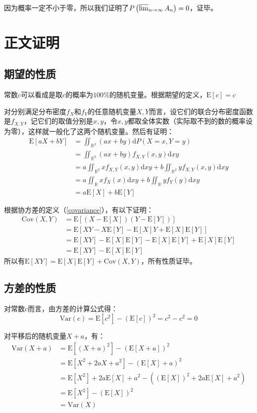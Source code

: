\documentclass[UTF8]{ctexbook}
\begin{document}
因为概率一定不小于零，所以我们证明了$P\left(\varlimsup_{n\to\infty}A_n\right)=0$，证毕。
\section{正文证明}
\subsection{期望的性质}
\label{mean-proof}
常数$c$可以看成是取$c$的概率为$100\%$的随机变量。根据期望的定义，$\mathrm E[c]=c$

对分别满足分布密度$f_X$和$f_Y$的任意随机变量$X, Y$而言，设它们的联合分布密度函数是$f_{X,Y}$，记它们的取值分别是$x, y$，令$x, y$都取全体实数（实际取不到的数的概率设为零），这样就一般化了这两个随机变量。然后有证明：
\begin{align*}
	\mathrm E[aX+bY]&=\iint_{\mathbb{R}^2}(ax+by)\mathrm dP(X=x, Y=y) \\
	&=\iint_{\mathbb{R}^2}(ax+by)f_{X,Y}(x,y)\mathrm dxy \\
	&=a\iint_{\mathbb{R}^2}xf_{X,Y}(x,y)\mathrm dxy+b\iint_{\mathbb{R}^2}yf_{X,Y}(x,y)\mathrm dxy \\
	&=a\iint_{\mathbb{R}}xf_{X}(x)\mathrm dxy+b\iint_{\mathbb{R}}yf_{Y}(y)\mathrm dxy \\
	&=a\mathrm E[X]+b\mathrm E[Y]
\end{align*}

根据协方差的定义（\ref{covariance}），有以下证明：
\begin{align*}
	\mathrm{Cov}(X,Y)&=\mathrm E[(X-\mathrm E[X])(Y-\mathrm E[Y])] \\
	&=\mathrm E[XY-X\mathrm E[Y]-\mathrm E[X]Y+\mathrm E[X]\mathrm E[Y]] \\
	&=\mathrm E[XY]-\mathrm E[X]\mathrm E[Y]-\mathrm E[X]\mathrm E[Y]+\mathrm E[X]\mathrm E[Y]\\
	&=\mathrm E[XY]-\mathrm E[X]\mathrm E[Y]
\end{align*}
所以有$\mathrm E[XY]=\mathrm E[X]\mathrm E[Y]+\mathrm{Cov}(X,Y)$，所有性质证毕。
\subsection{方差的性质}
\label{variance-proof}
对常数$c$而言，由方差的计算公式得：
\[
	\mathrm{Var}(c)=\mathrm E[c^2]-\left(\mathrm{E}[c]\right)^2=c^2-c^2=0
\]

对平移后的随机变量$X+a$，有：
\begin{align*}
	\mathrm{Var}(X+a)&=\mathrm E[(X+a)^2]-\left(\mathrm{E}[X+a]\right)^2 \\
	&=\mathrm E[X^2+2aX+a^2]-\left(\mathrm{E}[X]+a\right)^2 \\
	&=\mathrm E[X^2]+2a\mathrm E[X]+a^2-((\mathrm E[X])^2+2a\mathrm E[X]+a^2) \\
	&=\mathrm E[X^2]-(\mathrm E[X])^2 \\
	&=\mathrm{Var}(X)
\end{align*}
\end{document}
